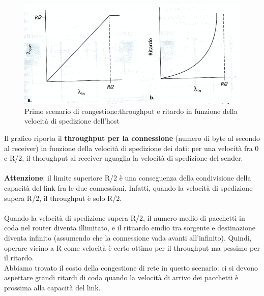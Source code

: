 \documentclass[11pt,a4paper]{article}
\begin{document}
\begin{figure}
	\includegraphics[scale=0.6]{img/040.png}
	\caption{Primo scenario di congestione:throughput e ritardo in funzione della velocità di spedizione dell'host}
\end{figure}
Il grafico riporta il \textbf{throughput per la connessione} (numero di byte al secondo al receiver) in funzione della velocità di spedizione dei dati: per una velocità fra 0 e R/2, il thorughput al receiver uguaglia la velocità di spedizione del sender. \\ \\
\textbf{Attenzione}: il limite superiore R/2 è una conseguenza della condivisione della capacità del link fra le due connessioni. Infatti, quando la velocità di spedizione supera R/2, il throughput è solo R/2. \\ \\
Quando la velocità di spedizione supera R/2, il numero medio di pacchetti in coda nel router diventa illimitato, e il rituardo emdio tra sorgente e destinazione diventa infinito (assumendo che la connessione vada avanti all'infinito). Quindi, operare vicino a R come velocità è certo ottimo per il throughput ma pessimo per il ritardo. \\
Abbiamo trovato il costo della congestione di rete in questo scenario: ci si devono aspettare grandi ritardi di coda quando la velocità di arrivo dei pacchetti è prossima alla capacità del link.
\end{document}
